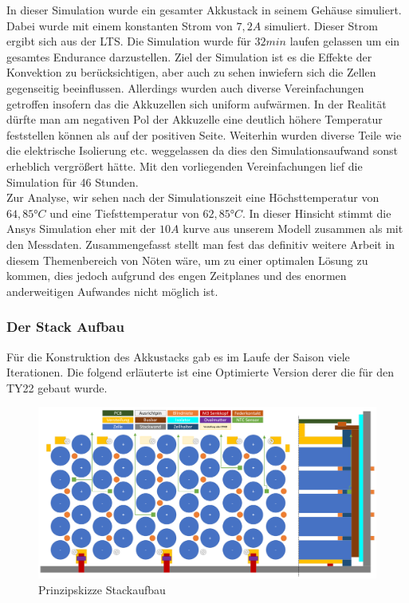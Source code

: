 In dieser Simulation wurde ein gesamter Akkustack in seinem Gehäuse simuliert. Dabei wurde mit einem konstanten Strom von \ensuremath{7,2 A} simuliert. Dieser Strom ergibt sich aus der \ac{LTS}. Die Simulation wurde für \ensuremath{32 min} laufen gelassen um ein gesamtes Endurance darzustellen. Ziel der Simulation ist es die Effekte der Konvektion zu berücksichtigen, aber auch zu sehen inwiefern sich die Zellen gegenseitig beeinflussen. Allerdings wurden auch diverse Vereinfachungen getroffen insofern das die Akkuzellen sich uniform aufwärmen. In der Realität dürfte man am negativen Pol der Akkuzelle eine deutlich höhere Temperatur feststellen können als auf der positiven Seite. Weiterhin wurden diverse Teile wie die elektrische Isolierung etc. weggelassen da dies den Simulationsaufwand sonst erheblich vergrößert hätte. Mit den vorliegenden Vereinfachungen lief die Simulation für 46 Stunden.\\
Zur Analyse, wir sehen nach der Simulationszeit eine Höchsttemperatur von \ensuremath{64,85°C} und eine Tiefsttemperatur von \ensuremath{62,85°C}. In dieser Hinsicht stimmt die Ansys Simulation eher mit der \ensuremath{10 A} kurve aus unserem Modell zusammen als mit den Messdaten. Zusammengefasst stellt man fest das definitiv weitere Arbeit in diesem Themenbereich von Nöten wäre, um zu einer optimalen Lösung zu kommen, dies jedoch aufgrund des engen Zeitplanes und des enormen anderweitigen Aufwandes nicht möglich ist.

\FloatBarrier
\subsubsection{Der Stack Aufbau} %

Für die Konstruktion des Akkustacks gab es im Laufe der Saison viele Iterationen. Die folgend erläuterte ist eine Optimierte Version derer die für den TY22 gebaut wurde.

\begin{figure}
	\centering
	\includegraphics[width=0.7\linewidth]{bilder/Stackaufbau_Prinzipskizze}
	\caption{Prinzipskizze Stackaufbau}
	\label{fig:stackaufbauprinzipskizze}
\end{figure}

